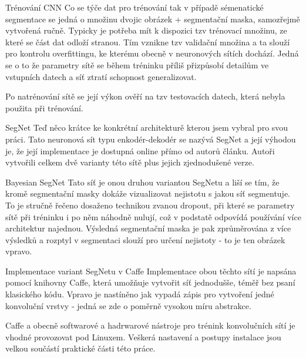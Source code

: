 \documentclass[aspectratio=1610]{beamer}
\begin{document}
\begin{frame}{Trénování CNN}
Co se týče dat pro trénování tak v případě sémenatické segmentace se jedná o množinu dvojic obrázek + segmentační maska, samozřejmě vytvořená ručně. Typicky je potřeba mít k dispozici tzv trénovací množinu, ze které se část dat odloží stranou. Tím vznikne tzv validační množina a ta slouží pro kontrolu overfittingu, ke kterému obecně v neuronových sítích dochází. Jedná se o to že parametry sítě se během tréninku příliš přizpůsobí detailům ve vstupních datech a síť ztratí schopnost generalizovat. 

Po natrénování sítě se její výkon ověří na tzv testovacích datech, která nebyla použita při trénování.  
\end{frame}
\begin{frame}{SegNet}
Teď něco krátce ke konkrétní architekturě kterou jsem vybral pro svou práci. Tato neuronová sít typu enkodér-dekodér se nazývá SegNet a její výhodou je, že její implementace je dostupná online přímo od autorů článku. Autoři vytvořili celkem dvě varianty této sítě plus jejich zjednodušené verze.
\end{frame}
\begin{frame}{Bayesian SegNet}
Tato síť je onou druhou variantou SegNetu a liší se tím, že kromě segmentační masky dokáže vizualizovat nejistotu s jakou síť segmentuje. To je stručně řečeno dosaženo technikou zvanou dropout, při které se parametry sítě při tréninku i po něm náhodně nulují, což v podstatě odpovídá používání více architektur najednou. Výsledná segmentační maska je pak zprůměrována z více výsledků a rozptyl v segmentaci slouží pro určení nejistoty - to je ten obrázek vpravo.
\end{frame}
\begin{frame}{Implementace variant SegNetu v Caffe}	
Implementace obou těchto sítí je napsána pomocí knihovny Caffe, která umožňuje vytvořit síť jednodušše, téměř bez psaní klasického kódu. Vpravo je nastíněno jak vypadá zápis pro vytvoření jedné konvoluční vrstvy - jedná se zde o poměrně vysokou míru abstrakce. 

Caffe a obecně softwarové a hadrwarové nástroje pro trénink konvolučních sítí je vhodné provozovat pod Linuxem. Veškerá nastavení a postupy instalace jsou velkou součástí praktické části této práce.
\end{frame}
\end{document}
